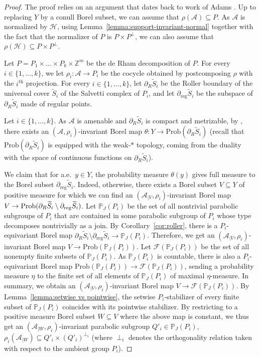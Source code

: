 \documentclass[JEP,XML,SOM,Unicode,NoFloatCountersInSection,published]{cedram}
\let\mathcal\mathscr
\theoremstyle{plain}
\theoremstyle{definition}
\newcommand{\cala}{\mathcal{A}}
\newcommand{\calf}{\mathcal{F}}
\newcommand{\calh}{\mathcal{H}}
\newcommand{\Prob}{\mathrm{Prob}}
\newcommand{\reg}{\mathrm{reg}}
\begin{document}
\begin{proof}
The proof relies on an argument that dates back to work of Adams \cite{Ada}. Up to replacing $Y$ by a conull Borel subset, we can assume that $\rho(\cala)\subseteq P$. As $\cala$ is normalized by $\calh$, using Lemma~\ref{lemma:support-invariant-normal} together with the fact that the normalizer of $P$ is $P\times P^{\perp}$, we can also assume that $\rho(\calh)\subseteq P\times P^\perp$.

Let $P=P_1\times\dots\times P_k\times\mathbb{Z}^m$ be the de Rham decomposition of $P$. For every $i\in\{1,\dots,k\}$, we let $\rho_i:\cala\to P_i$ be the cocycle obtained by postcomposing $\rho$ with the $i^{\text{th}}$ projection. For every $i\in\{1,\dots,k\}$, let $\partial_R \widetilde{S}_i$ be the Roller boundary of the universal cover $\widetilde{S}_i$ of the Salvetti complex of $P_i$, and let $\partial_\reg \widetilde{S}_i$ be the subspace of $\partial_R \widetilde{S}_i$ made of regular points.

Let $i\in\{1,\dots,k\}$. As $\cala$ is amenable and $\partial_R \widetilde{S}_i$ is compact and metrizable, by \cite[Prop.\,4.14]{Kid-survey}, there exists an $(\cala,\rho_i)$-invariant Borel map $\theta:Y\to\Prob(\partial_R \widetilde{S}_i)$ (recall that $\Prob(\partial_R\widetilde{S}_i)$ is equipped with the weak-$*$ topology, coming from the duality with the space of continuous functions on $\partial_R\widetilde{S}_i$).

We claim that for a.e.\ $y\in Y$, the probability measure $\theta(y)$ gives full measure to the Borel subset $\partial_\reg \widetilde{S}_i$. Indeed, otherwise, there exists a Borel subset $V\subseteq Y$ of positive measure for which we can find an $(\cala_{|V},\rho_i)$-invariant Borel map $V\to\Prob(\partial_R\widetilde{S}_i\setminus\nobreak\partial_\reg\widetilde{S}_i)$. Let $\mathbb{P}_J(P_i)$ be the set of all nontrivial parabolic subgroups of $P_i$ that are contained in some parabolic subgroup of $P_i$ whose type decomposes nontrivially as a join.
By Corollary~\ref{cor:roller}, there is a $P_i$-equivariant Borel map $\partial_R\widetilde{S}_i\setminus\partial_\reg\widetilde{S}_i\to \mathbb{P}_J(P_i)$. Therefore, we get an $(\cala_{|V},\rho_i)$-invariant Borel map $V\to\Prob(\mathbb{P}_J(P_i))$. Let $\calf(\mathbb{P}_J(P_i))$ be the set of all nonempty finite subsets of $\mathbb{P}_J(P_i)$. As $\mathbb{P}_J(P_i)$ is countable, there is also a $P_i$-equivariant Borel map $\Prob(\mathbb{P}_J(P_i))\to\calf(\mathbb{P}_J(P_i))$, sending a probability measure $\eta$ to the finite set of all elements of $\mathbb{P}_J(P_i)$ of maximal $\eta$-measure. In summary, we obtain an $(\cala_{|V},\rho_i)$-invariant Borel map $V\to\calf(\mathbb{P}_J(P_i))$. By Lemma~\ref{lemma:setwise vs pointwise}, the setwise $P_i$-stabilizer of every finite subset of $\mathbb{P}_J(P_i)$ coincides with its pointwise stabilizer. By restricting to a positive measure Borel subset $W\subseteq V$ where the above map is constant, we thus get an $(\cala_{|W},\rho_i)$-invariant parabolic subgroup $Q'_i\in\mathbb{P}_J(P_i)$, \ie $\rho_i(\cala_{|W})\subseteq Q'_i\times (Q'_i)^{\perp_i}$ (where $\perp_i$ denotes the orthogonality relation taken with respect to the ambient group $P_i$).\enlargethispage{\baselineskip}%


\end{proof}
\end{document}
